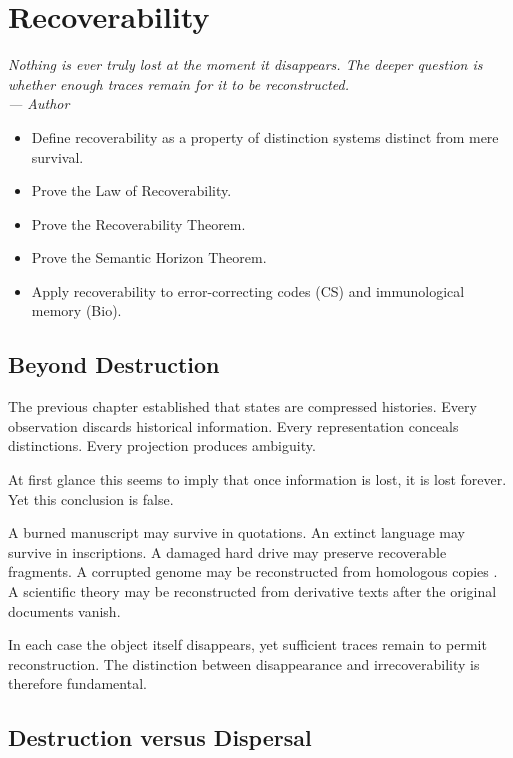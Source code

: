 \documentclass[12pt,twoside,openright]{book}
\newenvironment{epigraph}[2]{%
  \vspace{1em}\begin{flushright}
  \begin{minipage}{0.72\textwidth}
  \itshape\small #1\\[0.4em]
  \upshape\footnotesize\sffamily\color{DistGray}--- #2
  \end{minipage}\end{flushright}\vspace{1.5em}}{}
\newenvironment{objectives}{%
  \begin{tcolorbox}[colback=DistBlue!5,colframe=DistBlue,
    title={\faCheckCircle\enspace Learning Objectives},
    fonttitle=\sffamily\bfseries\color{white},
    attach boxed title to top left={yshift=-2mm,xshift=4mm},
    boxed title style={colback=DistBlue},breakable]
  \begin{itemize}[leftmargin=*,nosep]}{%
  \end{itemize}\end{tcolorbox}\vspace{1em}}
\begin{document}
\chapter{Recoverability}
\label{ch:recoverability}

\begin{epigraph}{Nothing is ever truly lost at the moment
  it disappears. The deeper question is whether enough
  traces remain for it to be reconstructed.}{Author}
\end{epigraph}

\begin{objectives}
  \item Define recoverability as a property of distinction
        systems distinct from mere survival.
  \item Prove the Law of Recoverability.
  \item Prove the Recoverability Theorem.
  \item Prove the Semantic Horizon Theorem.
  \item Apply recoverability to error-correcting codes
        (CS) and immunological memory (Bio).
\end{objectives}

\section{Beyond Destruction}
\label{sec:ch5-beyond}

The previous chapter established that states are
compressed histories. Every observation discards historical
information. Every representation conceals distinctions.
Every projection produces ambiguity.

At first glance this seems to imply that once information
is lost, it is lost forever. Yet this conclusion is false.

A burned manuscript may survive in quotations.
An extinct language may survive in inscriptions.
A damaged hard drive may preserve recoverable fragments.
A corrupted genome may be reconstructed from homologous
copies \parencite{kauffman1993}.
A scientific theory may be reconstructed from derivative
texts after the original documents vanish.

In each case the object itself disappears, yet sufficient
traces remain to permit reconstruction. The distinction
between disappearance and irrecoverability is therefore
fundamental.

\section{Destruction versus Dispersal}
\label{sec:ch5-dispersal}
\end{document}
